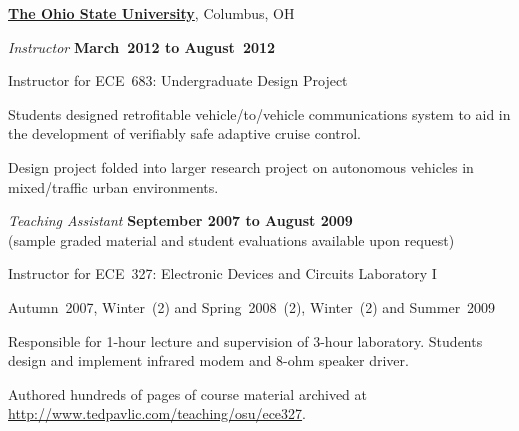 \documentclass[10pt]{article}           %
\newcommand{\entry}{\item[{}]}
\newcommand{\halfblankline}{\quad\vspace{-0.5\baselineskip}\pagebreak[3]}
\begin{document}
\halfblankline

\href{http://www.osu.edu/}{\textbf{The Ohio State University}},
Columbus, OH
\begin{cvlist}[loose]

    \entry \textit{Instructor}%
        \hfill \textbf{March~2012 to August~2012}
    \begin{cvlist}
        \item Instructor for ECE~683: Undergraduate Design Project
        \begin{cvlist}
            \item Students designed retrofitable vehicle\-/to\-/vehicle
                communications system to aid in the development of
                verifiably safe adaptive cruise control.
            \item Design project folded into larger research project
                on autonomous vehicles in mixed\-/traffic urban
                environments.
        \end{cvlist}
    \end{cvlist}

    \entry \textit{Teaching Assistant}%
        \hfill \textbf{September 2007 to August 2009}\\
        (sample graded material and student evaluations available upon
        request)
    \begin{cvlist}
        \item Instructor for ECE~327: Electronic Devices and Circuits Laboratory I
        \begin{cvlist}
            \item Autumn~2007, Winter~(2) and Spring~2008~(2),
                Winter~(2) and Summer~2009


            \item Responsible for 1-hour lecture and supervision of
                3-hour laboratory. Students design and implement
                infrared modem and 8-ohm speaker driver.

            \item Authored hundreds of pages of course material
                archived at\\
                \url{http://www.tedpavlic.com/teaching/osu/ece327}.
        \end{cvlist}

        \halfblankline


\end{cvlist}
\end{cvlist}
\end{document}
